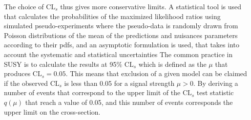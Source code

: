 The choice of $\mathrm{CL}_{s}$ thus gives more conservative limits. 
A statistical tool is used that calculates the probabilities of the maximized likelihood ratios using simulated pseudo-experiments where the pseudo-data is randomly drawn from Poisson distributions of the mean of the predictions and nuisances parameters according to their pdfs, and an asymptotic formulation \cite{Cowan:2010js} is used, that takes into account the systematic and statistical uncertainties 
The common practice in SUSY is to calculate the results at 95\% $\mathrm{CL}_{s}$ which is defined as the $\mu$ that produces $\mathrm{CL}_{s}=0.05$.
This means that exclusion of a given model can be claimed if the observed $\mathrm{CL}_{s}$ is less than 0.05 for a signal strength $\mu>0$. 
By deriving a number of events that correspond to the upper limit of the $\mathrm{CL}_{s}$ test statistic $q(\mu)$ that reach a value of 0.05, and this number of events corresponds the upper limit on the cross-section. 
